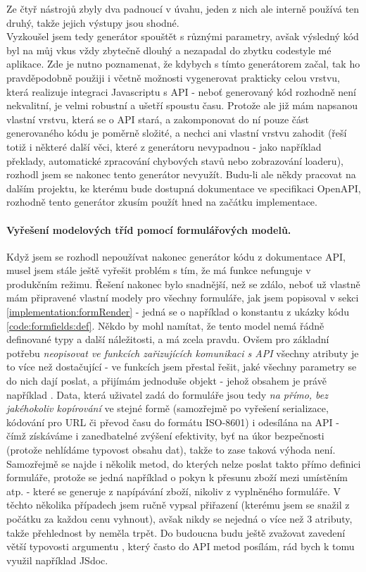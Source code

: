 Ze čtyř nástrojů zbyly dva padnoucí v úvahu, jeden z nich ale interně používá ten druhý, takže jejich výstupy jsou shodné.\\
Vyzkoušel jsem tedy generátor spouštět s různými parametry, avšak výsledný kód byl na můj vkus vždy zbytečně dlouhý a nezapadal do zbytku codestyle mé aplikace. Zde je nutno poznamenat, že kdybych s tímto generátorem začal, tak ho pravděpodobně použiji i včetně možnosti vygenerovat prakticky celou vrstvu, která realizuje integraci Javascriptu s API - neboť generovaný kód rozhodně není nekvalitní, je velmi robustní a ušetří spoustu času. Protože ale již mám napsanou vlastní vrstvu, která se o API stará, a zakomponovat do ní pouze část generovaného kódu je poměrně složité, a nechci ani vlastní vrstvu zahodit (řeší totiž i některé další věci, které z generátoru nevypadnou - jako například překlady, automatické zpracování chybových stavů nebo zobrazování loaderu), rozhodl jsem se nakonec tento generátor nevyužít. Budu-li ale někdy pracovat na dalším projektu, ke kterému bude dostupná dokumentace ve specifikaci OpenAPI, rozhodně tento generátor zkusím použít hned na začátku implementace.

\paragraph{Vyřešení modelových tříd pomocí formulářových modelů.} Když jsem se rozhodl nepoužívat nakonec generátor kódu z dokumentace API, musel jsem stále ještě vyřešit problém s tím, že má funkce  nefunguje v produkčním režimu. Řešení nakonec bylo snadnější, než se zdálo, neboť už vlastně mám připravené vlastní modely pro všechny formuláře, jak jsem popisoval v sekci \ref{implementation:formRender} - jedná se o například o konstantu  z ukázky kódu \ref{code:formfields:def}. Někdo by mohl namítat, že tento model nemá řádně definované typy a další náležitosti, a má zcela pravdu. Ovšem pro základní potřebu \emph{neopisovat ve funkcích zařizujících komunikaci s API} všechny atributy je to více než dostačující - ve funkcích jsem přestal řešit, jaké všechny parametry se do nich dají poslat, a přijímám jednoduše objekt  - jehož obsahem je právě například . Data, která uživatel zadá do formuláře jsou tedy \emph{na přímo, bez jakéhokoliv kopírování} ve stejné formě (samozřejmě po vyřešení serializace, kódování pro URL či převod času do formátu ISO-8601) i odesílána na API - čímž získáváme i zanedbatelné zvýšení efektivity, byť na úkor bezpečnosti (protože nehlídáme typovost obsahu dat), takže to zase taková výhoda není.\\
Samozřejmě se najde i několik metod, do kterých nelze poslat takto přímo definici formuláře, protože se jedná například o pokyn k přesunu zboží mezi umístěním atp. - které se generuje z napípávání zboží, nikoliv z vyplněného formuláře. V těchto několika případech jsem ručně vypsal přiřazení (kterému jsem se snažil z počátku za každou cenu vyhnout), avšak nikdy se nejedná o více než 3 atributy, takže přehlednost by neměla trpět.
Do budoucna budu ještě zvažovat zavedení větší typovosti argumentu , který často do API metod posílám, rád bych k tomu využil například JSdoc.

